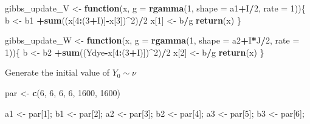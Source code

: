 \documentclass[
]{article}
\newenvironment{Shaded}{\begin{snugshade}}{\end{snugshade}}
\newcommand{\AttributeTok}[1]{\textcolor[rgb]{0.13,0.29,0.53}{#1}}
\newcommand{\ControlFlowTok}[1]{\textcolor[rgb]{0.13,0.29,0.53}{\textbf{#1}}}
\newcommand{\DecValTok}[1]{\textcolor[rgb]{0.00,0.00,0.81}{#1}}
\newcommand{\FunctionTok}[1]{\textcolor[rgb]{0.13,0.29,0.53}{\textbf{#1}}}
\newcommand{\NormalTok}[1]{#1}
\newcommand{\OtherTok}[1]{\textcolor[rgb]{0.56,0.35,0.01}{#1}}
\newcommand{\SpecialCharTok}[1]{\textcolor[rgb]{0.81,0.36,0.00}{\textbf{#1}}}
\begin{document}
\begin{Shaded}
\begin{Highlighting}[]
\NormalTok{gibbs\_update\_V }\OtherTok{\textless{}{-}} \ControlFlowTok{function}\NormalTok{(x, }\AttributeTok{g =} \FunctionTok{rgamma}\NormalTok{(}\DecValTok{1}\NormalTok{, }\AttributeTok{shape =}\NormalTok{ a1}\SpecialCharTok{+}\NormalTok{I}\SpecialCharTok{/}\DecValTok{2}\NormalTok{, }\AttributeTok{rate =} \DecValTok{1}\NormalTok{))\{}
\NormalTok{  b }\OtherTok{\textless{}{-}}\NormalTok{ b1 }\SpecialCharTok{+}\FunctionTok{sum}\NormalTok{((x[}\DecValTok{4}\SpecialCharTok{:}\NormalTok{(}\DecValTok{3}\SpecialCharTok{+}\NormalTok{I)]}\SpecialCharTok{{-}}\NormalTok{x[}\DecValTok{3}\NormalTok{])}\SpecialCharTok{\^{}}\DecValTok{2}\NormalTok{)}\SpecialCharTok{/}\DecValTok{2}
\NormalTok{  x[}\DecValTok{1}\NormalTok{]  }\OtherTok{\textless{}{-}}\NormalTok{ b}\SpecialCharTok{/}\NormalTok{g}
  \FunctionTok{return}\NormalTok{(x)}
\NormalTok{\}}

\NormalTok{gibbs\_update\_W }\OtherTok{\textless{}{-}} \ControlFlowTok{function}\NormalTok{(x, }\AttributeTok{g =} \FunctionTok{rgamma}\NormalTok{(}\DecValTok{1}\NormalTok{, }\AttributeTok{shape =}\NormalTok{ a2}\SpecialCharTok{+}\NormalTok{I}\SpecialCharTok{*}\NormalTok{J}\SpecialCharTok{/}\DecValTok{2}\NormalTok{, }\AttributeTok{rate =} \DecValTok{1}\NormalTok{))\{}
\NormalTok{  b }\OtherTok{\textless{}{-}}\NormalTok{ b2 }\SpecialCharTok{+}\FunctionTok{sum}\NormalTok{((Ydye}\SpecialCharTok{{-}}\NormalTok{x[}\DecValTok{4}\SpecialCharTok{:}\NormalTok{(}\DecValTok{3}\SpecialCharTok{+}\NormalTok{I)])}\SpecialCharTok{\^{}}\DecValTok{2}\NormalTok{)}\SpecialCharTok{/}\DecValTok{2}
\NormalTok{  x[}\DecValTok{2}\NormalTok{]  }\OtherTok{\textless{}{-}}\NormalTok{ b}\SpecialCharTok{/}\NormalTok{g}
  \FunctionTok{return}\NormalTok{(x)}
\NormalTok{\}}
\end{Highlighting}
\end{Shaded}

Generate the initial value of \(Y_0\sim \nu\)

\begin{Shaded}
\begin{Highlighting}[]
\NormalTok{par }\OtherTok{\textless{}{-}} \FunctionTok{c}\NormalTok{(}\DecValTok{6}\NormalTok{, }\DecValTok{6}\NormalTok{, }\DecValTok{6}\NormalTok{, }\DecValTok{6}\NormalTok{, }\DecValTok{1600}\NormalTok{, }\DecValTok{1600}\NormalTok{)}

\NormalTok{a1 }\OtherTok{\textless{}{-}}\NormalTok{ par[}\DecValTok{1}\NormalTok{]; b1 }\OtherTok{\textless{}{-}}\NormalTok{ par[}\DecValTok{2}\NormalTok{]; a2 }\OtherTok{\textless{}{-}}\NormalTok{ par[}\DecValTok{3}\NormalTok{]; b2 }\OtherTok{\textless{}{-}}\NormalTok{ par[}\DecValTok{4}\NormalTok{]; a3 }\OtherTok{\textless{}{-}}\NormalTok{ par[}\DecValTok{5}\NormalTok{]; b3 }\OtherTok{\textless{}{-}}\NormalTok{ par[}\DecValTok{6}\NormalTok{];}
\end{Highlighting}
\end{Shaded}
\end{document}
